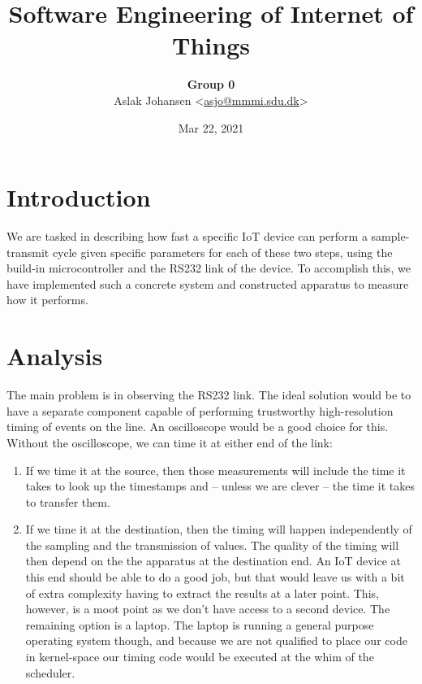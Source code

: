 \documentclass[a4paper]{article}
\begin{document}
\title{Software Engineering of Internet of Things\\\scalebox{.85}{Handin 0: Sampling Rate}}
\author{
    \textbf{Group 0} \\
    Aslak Johansen <\href{mailto:asjo@mmmi.sdu.dk}{asjo@mmmi.sdu.dk}>
}
\date{Mar 22, 2021}
\maketitle
\vspace{5mm}

\section{Introduction}

We are tasked in describing how fast a specific IoT device can perform a sample-transmit cycle given specific parameters for each of these two steps, using the build-in microcontroller and the RS232 link of the device. To accomplish this, we have implemented such a concrete system and constructed apparatus to measure how it performs.

\section{Analysis}

The main problem is in observing the RS232 link. The ideal solution would be to have a separate component capable of performing trustworthy high-resolution timing of events on the line. An oscilloscope would be a good choice for this. Without the oscilloscope, we can time it at either end of the link:
\begin{enumerate}
  \item If we time it at the source, then those measurements will include the time it takes to look up the timestamps and -- unless we are clever -- the time it takes to transfer them.
  \item If we time it at the destination, then the timing will happen independently of the sampling and the transmission of values. The quality of the timing will then depend on the the apparatus at the destination end. An IoT device at this end should be able to do a good job, but that would leave us with a bit of extra complexity having to extract the results at a later point. This, however, is a moot point as we don't have access to a second device. The remaining option is a laptop. The laptop is running a general purpose operating system though, and because we are not qualified to place our code in kernel-space our timing code would be executed at the whim of the scheduler.
\end{enumerate}
\end{document}
